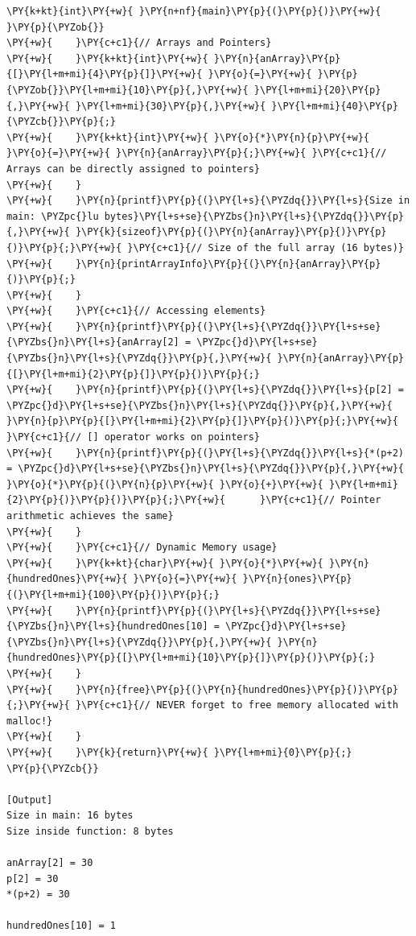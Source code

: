 \begin{Verbatim}[label=\makebox{\url{https://github.com/lucabaldini/cmepda/tree/master/slides/latex/snippets/arrays_and_malloc.c}},commandchars=\\\{\}]
\PY{k+kt}{int}\PY{+w}{ }\PY{n+nf}{main}\PY{p}{(}\PY{p}{)}\PY{+w}{ }\PY{p}{\PYZob{}}
\PY{+w}{    }\PY{c+c1}{// Arrays and Pointers}
\PY{+w}{    }\PY{k+kt}{int}\PY{+w}{ }\PY{n}{anArray}\PY{p}{[}\PY{l+m+mi}{4}\PY{p}{]}\PY{+w}{ }\PY{o}{=}\PY{+w}{ }\PY{p}{\PYZob{}}\PY{l+m+mi}{10}\PY{p}{,}\PY{+w}{ }\PY{l+m+mi}{20}\PY{p}{,}\PY{+w}{ }\PY{l+m+mi}{30}\PY{p}{,}\PY{+w}{ }\PY{l+m+mi}{40}\PY{p}{\PYZcb{}}\PY{p}{;}
\PY{+w}{    }\PY{k+kt}{int}\PY{+w}{ }\PY{o}{*}\PY{n}{p}\PY{+w}{ }\PY{o}{=}\PY{+w}{ }\PY{n}{anArray}\PY{p}{;}\PY{+w}{ }\PY{c+c1}{// Arrays can be directly assigned to pointers}
\PY{+w}{    }
\PY{+w}{    }\PY{n}{printf}\PY{p}{(}\PY{l+s}{\PYZdq{}}\PY{l+s}{Size in main: \PYZpc{}lu bytes}\PY{l+s+se}{\PYZbs{}n}\PY{l+s}{\PYZdq{}}\PY{p}{,}\PY{+w}{ }\PY{k}{sizeof}\PY{p}{(}\PY{n}{anArray}\PY{p}{)}\PY{p}{)}\PY{p}{;}\PY{+w}{ }\PY{c+c1}{// Size of the full array (16 bytes)}
\PY{+w}{    }\PY{n}{printArrayInfo}\PY{p}{(}\PY{n}{anArray}\PY{p}{)}\PY{p}{;}
\PY{+w}{    }
\PY{+w}{    }\PY{c+c1}{// Accessing elements}
\PY{+w}{    }\PY{n}{printf}\PY{p}{(}\PY{l+s}{\PYZdq{}}\PY{l+s+se}{\PYZbs{}n}\PY{l+s}{anArray[2] = \PYZpc{}d}\PY{l+s+se}{\PYZbs{}n}\PY{l+s}{\PYZdq{}}\PY{p}{,}\PY{+w}{ }\PY{n}{anArray}\PY{p}{[}\PY{l+m+mi}{2}\PY{p}{]}\PY{p}{)}\PY{p}{;}
\PY{+w}{    }\PY{n}{printf}\PY{p}{(}\PY{l+s}{\PYZdq{}}\PY{l+s}{p[2] = \PYZpc{}d}\PY{l+s+se}{\PYZbs{}n}\PY{l+s}{\PYZdq{}}\PY{p}{,}\PY{+w}{ }\PY{n}{p}\PY{p}{[}\PY{l+m+mi}{2}\PY{p}{]}\PY{p}{)}\PY{p}{;}\PY{+w}{            }\PY{c+c1}{// [] operator works on pointers}
\PY{+w}{    }\PY{n}{printf}\PY{p}{(}\PY{l+s}{\PYZdq{}}\PY{l+s}{*(p+2) = \PYZpc{}d}\PY{l+s+se}{\PYZbs{}n}\PY{l+s}{\PYZdq{}}\PY{p}{,}\PY{+w}{ }\PY{o}{*}\PY{p}{(}\PY{n}{p}\PY{+w}{ }\PY{o}{+}\PY{+w}{ }\PY{l+m+mi}{2}\PY{p}{)}\PY{p}{)}\PY{p}{;}\PY{+w}{      }\PY{c+c1}{// Pointer arithmetic achieves the same}
\PY{+w}{    }
\PY{+w}{    }\PY{c+c1}{// Dynamic Memory usage}
\PY{+w}{    }\PY{k+kt}{char}\PY{+w}{ }\PY{o}{*}\PY{+w}{ }\PY{n}{hundredOnes}\PY{+w}{ }\PY{o}{=}\PY{+w}{ }\PY{n}{ones}\PY{p}{(}\PY{l+m+mi}{100}\PY{p}{)}\PY{p}{;}
\PY{+w}{    }\PY{n}{printf}\PY{p}{(}\PY{l+s}{\PYZdq{}}\PY{l+s+se}{\PYZbs{}n}\PY{l+s}{hundredOnes[10] = \PYZpc{}d}\PY{l+s+se}{\PYZbs{}n}\PY{l+s}{\PYZdq{}}\PY{p}{,}\PY{+w}{ }\PY{n}{hundredOnes}\PY{p}{[}\PY{l+m+mi}{10}\PY{p}{]}\PY{p}{)}\PY{p}{;}
\PY{+w}{    }
\PY{+w}{    }\PY{n}{free}\PY{p}{(}\PY{n}{hundredOnes}\PY{p}{)}\PY{p}{;}\PY{+w}{ }\PY{c+c1}{// NEVER forget to free memory allocated with malloc!}
\PY{+w}{    }
\PY{+w}{    }\PY{k}{return}\PY{+w}{ }\PY{l+m+mi}{0}\PY{p}{;}
\PY{p}{\PYZcb{}}

[Output]
Size in main: 16 bytes
Size inside function: 8 bytes

anArray[2] = 30
p[2] = 30
*(p+2) = 30

hundredOnes[10] = 1
\end{Verbatim}